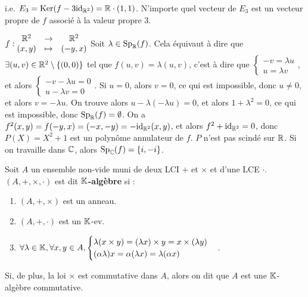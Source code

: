 \documentclass[12pt, a4paper]{report}
\begin{document}
\begin{example}
\begin{outline}
        \1 i.e. $E_3 = \mathrm{Ker}(f - 3\mathrm{id}_{\mathbb{R}^2}) = \mathbb{R}\cdot(1,1)$. N'importe quel vecteur de $E_3$ est un vecteur propre de $f$ associé à la valeur propre $3$.
    \end{outline}
\end{example}

\begin{example}
    \begin{outline}
        $f : \begin{matrix}
            \mathbb{R}^2 &\to &\mathbb{R}^2\\
            (x,y) &\mapsto &(-y,x)
        \end{matrix}$
        \1 Soit $\lambda \in \mathrm{Sp}_{\mathbb{R}}(f)$.
        \1 Cela équivaut à dire que $\exists (u,v) \in \mathbb{R}^2 \setminus \{(0,0)\}$ tel que $f(u,v) = \lambda (u,v)$, c'est à dire que $\begin{cases}-v = \lambda u\\ u = \lambda v\end{cases}$, et alors $\begin{cases} -v - \lambda u = 0\\ u - \lambda v = 0\end{cases}$.
        \1 Si $u = 0$, alors $v = 0$, ce qui est impossible, donc $u \neq 0$, et alors $v = -\lambda u$.
        \1 On trouve alors $u - \lambda(-\lambda u) = 0$, et alors $1 + \lambda^2 = 0$, ce qui est impossible, donc $\mathrm{Sp}_{\mathbb{R}}(f) = \emptyset$.
        \1 On a $f^2(x,y) = f(-y,x) = (-x,-y) = -\mathrm{id}_{\mathbb{R}^2}(x,y)$, et alors $f^2 + \mathrm{id}_{\mathbb{R}^2} = 0$, donc $P(X) = X^2 + 1$ est un polynôme annulateur de $f$. $P$ n'est pas scindé sur $\mathbb{R}$.
        Si on travaille dans $\mathbb{C}$, alors $\mathrm{Sp}_{\mathbb{C}}(f) = \{i,-i\}$.
    \end{outline}
\end{example}

\begin{definition}[Algèbre]
    Soit $A$ un ensemble non-vide muni de deux LCI $+$ et $\times$ et d'une LCE $\cdot$.
    $(A,+,\times,\cdot)$ est dit \textbf{$\mathbb{K}$-algèbre} si :
    \begin{enumerate}
        \item $(A,+,\times)$ est un anneau.
        \item $(A,+,\cdot)$ est un $\mathbb{K}$-ev.
        \item $\forall \lambda \in \mathbb{K}, \forall x,y \in A, \begin{cases} \lambda(x\times y) = (\lambda x)\times y = x \times (\lambda y) \\ (\alpha\lambda)x = \alpha(\lambda x) = \lambda(\alpha x)\end{cases}$.
    \end{enumerate}

    Si, de plus, la loi $\times$ est commutative dans $A$, alors on dit que $A$ est une $\mathbb{K}$-algèbre commutative.
\end{definition}
\end{document}
